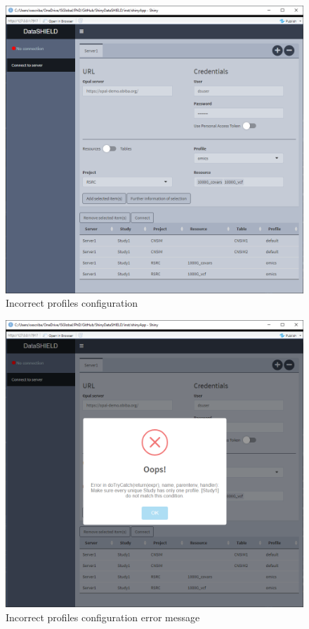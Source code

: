 \documentclass[
]{book}
\begin{document}
\begin{figure}

{\centering \includegraphics[width=13.81in]{images/opal-datashield-profiles2} 

}

\caption{Incorrect profiles configuration}\label{fig:opal-profiles2}
\end{figure}

\begin{figure}

{\centering \includegraphics[width=13.81in]{images/opal-datashield-profiles3} 

}

\caption{Incorrect profiles configuration error message}\label{fig:opal-profiles3}
\end{figure}
\end{document}
